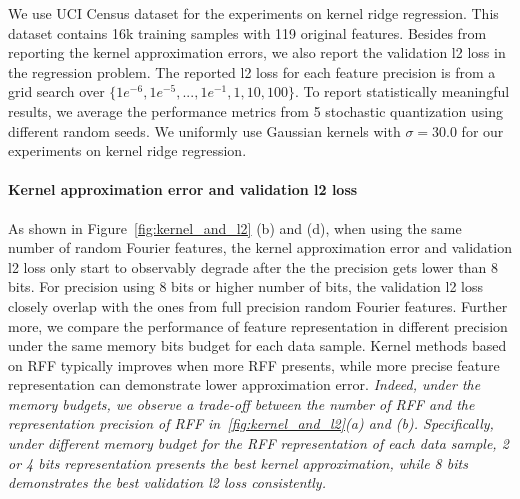 We use UCI Census dataset for the experiments on kernel ridge regression. This dataset contains 16k training samples with 119 original features. Besides from reporting the kernel approximation errors, we also report the validation l2 loss in the regression problem. The reported l2 loss for each feature precision is from a grid search over $\{1e^{-6}, 1e^{-5}, ..., 1e^{-1}, 1, 10, 100\}$. To report statistically meaningful results, we average the performance metrics from 5 stochastic quantization using different random seeds. We uniformly use Gaussian kernels with $\sigma=30.0$ for our experiments on kernel ridge regression.

\paragraph{Kernel approximation error and validation l2 loss}
As shown in Figure~\ref{fig:kernel_and_l2} (b) and (d), when using the same number of random Fourier features, the kernel approximation error and validation l2 loss only start to observably degrade after the the precision gets lower than 8 bits. For precision using 8 bits or higher number of bits, the validation l2 loss closely overlap with the ones from full precision random Fourier features. Further more, we compare the performance of feature representation in different precision under the same memory bits budget for each data sample. Kernel methods based on RFF typically improves when more RFF presents, while more precise feature representation can demonstrate lower approximation error. \emph{Indeed, under the memory budgets, we observe a trade-off between the number of RFF and the representation precision of RFF in~\ref{fig:kernel_and_l2}(a) and (b). Specifically, under different memory budget for the RFF representation of each data sample, 2 or 4 bits representation presents the best kernel approximation, while 8 bits demonstrates the best validation l2 loss consistently.}


